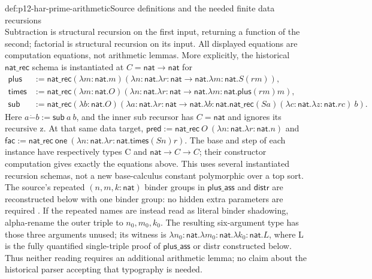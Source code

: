 \begin{hbdefinition}{def:p12-har-prime-arithmetic}{Source definitions and the needed finite data recursions}
\[\]
Subtraction is structural recursion on the first input, returning a
function of the second; factorial is structural recursion on its input.
All displayed equations are computation equations, not arithmetic
lemmas. More explicitly, the historical \(\mathsf{nat\_rec}\) schema
is instantiated at \(C=\mathsf{nat}\to\mathsf{nat}\) for
\[
\begin{aligned}
 \mathsf{plus}&:=\mathsf{nat\_rec}
  (\lambda m:\mathsf{nat}.m)
  (\lambda n:\mathsf{nat}.\lambda r:\mathsf{nat}\to\mathsf{nat}.
                    \lambda m:\mathsf{nat}.S(r m)),\\
 \mathsf{times}&:=\mathsf{nat\_rec}
  (\lambda m:\mathsf{nat}.O)
  (\lambda n:\mathsf{nat}.\lambda r:\mathsf{nat}\to\mathsf{nat}.
                    \lambda m:\mathsf{nat}.\mathsf{plus}(r m)m),\\
 \mathsf{sub}&:=\mathsf{nat\_rec}
  (\lambda b:\mathsf{nat}.O)
  (\lambda a:\mathsf{nat}.\lambda r:\mathsf{nat}\to\mathsf{nat}.
    \lambda b:\mathsf{nat}.
     \mathsf{nat\_rec}(S a)
       (\lambda c:\mathsf{nat}.\lambda z:\mathsf{nat}.r c)\ b).
\end{aligned}
\]
Here \(a\mathbin{\dot{-}}b:=\mathsf{sub}\ a\ b\), and the inner
sub recursor has \(C=\mathsf{nat}\) and ignores its recursive z.
At that same data target,
\(\mathsf{pred}:=\mathsf{nat\_rec}\ O\
(\lambda n:\mathsf{nat}.\lambda r:\mathsf{nat}.n)\)
and \(\mathsf{fac}:=\mathsf{nat\_rec}\ \mathsf{one}\
(\lambda n:\mathsf{nat}.\lambda r:\mathsf{nat}.\mathsf{times}(S n)r)\).
The base and step of each instance have respectively types C and
\(\mathsf{nat}\to C\to C\); their constructor computation gives
exactly the equations above. This uses several instantiated recursion
schemas, not a new base-calculus constant polymorphic over a top sort.
The source's repeated \((n,m,k:\mathsf{nat})\) binder groups in
\(\mathsf{plus\_ass}\) and \(\mathsf{distr}\) are reconstructed below
with one binder group: no hidden extra parameters are required
\cite[pp.~1219--1220 and p.~1215, note~4]{BarendregtGeuvers2001}.
If the repeated names are instead read as literal binder shadowing,
alpha-rename the outer triple to \(n_0,m_0,k_0\). The resulting
six-argument type has those three arguments unused; its witness is
\(\lambda n_0:\mathsf{nat}.\lambda m_0:\mathsf{nat}.
\lambda k_0:\mathsf{nat}.L\), where L is the fully quantified
single-triple proof of \(\mathsf{plus\_ass}\) or distr constructed below. Thus neither
reading requires an additional arithmetic lemma; no claim about the
historical parser accepting that typography is needed.
\end{hbdefinition}


